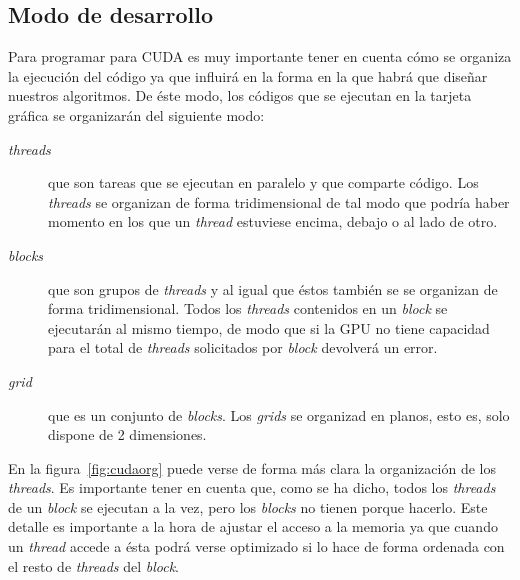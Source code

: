 \subsection{Modo de desarrollo}

Para programar para CUDA es muy importante tener en cuenta cómo se organiza la ejecución del código ya que influirá en la forma en la que habrá que diseñar nuestros algoritmos. De éste modo, los códigos que se ejecutan en la tarjeta gráfica se organizarán del siguiente modo:

\begin{description}
	\item[\emph{threads}] que son tareas que se ejecutan en paralelo y que comparte código. Los \emph{threads} se organizan de forma tridimensional de tal modo que podría haber momento en los que un \emph{thread} estuviese encima, debajo o al lado de otro.
	\item[\emph{blocks}] que son grupos de \emph{threads} y al igual que éstos también se se organizan de forma tridimensional. Todos los \emph{threads} contenidos en un \emph{block} se ejecutarán al mismo tiempo, de modo que si la GPU no tiene capacidad para el total de \emph{threads} solicitados por \emph{block} devolverá un error.
	\item[\emph{grid}] que es un conjunto de \emph{blocks}. Los \emph{grids} se organizad en planos, esto es, solo dispone de 2 dimensiones.
\end{description}

En la figura~\ref{fig:cudaorg} puede verse de forma más clara la organización de los \emph{threads}. Es importante tener en cuenta que, como se ha dicho, todos los \emph{threads} de un \emph{block} se ejecutan a la vez, pero los \emph{blocks} no tienen porque hacerlo. Este detalle es importante a la hora de ajustar el acceso a la memoria ya que cuando un \emph{thread} accede a ésta podrá verse optimizado si lo hace de forma ordenada con el resto de \emph{threads} del \emph{block}.

